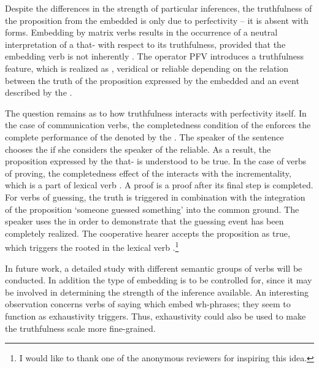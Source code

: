 \documentclass[output=paper,  modfonts,  newtxmath,  hidelinks		  ]{langscibook}
\begin{document}
Despite the differences in the strength of particular inferences, the truthfulness of the proposition from the embedded  is only due to perfectivity – it is absent with  forms. Embedding by  matrix verbs results in the occurrence of a neutral interpretation of a that- with respect to its truthfulness, provided that the embedding  verb is not inherently . The  operator PFV introduces a truthfulness feature, which is realized as , veridical or reliable depending on the relation between the truth of the proposition expressed by the embedded  and an event described by the .

The question remains as to how truthfulness interacts with perfectivity itself. In the case of communication verbs, the completedness condition of the  enforces the complete performance of the  denoted by the . The speaker of the sentence chooses the  if she considers the speaker of the  reliable. As a result, the proposition expressed by the that- is understood to be true. In the case of verbs of proving, the completedness effect of the  interacts with the incrementality, which is a part of lexical verb . A proof is a proof after its final step is completed. For verbs of guessing, the truth  is triggered in combination with the integration of the proposition `someone guessed something' into the common ground. The speaker uses the  in order to demonstrate that the guessing event has been completely realized. The cooperative hearer accepts the proposition as true, which triggers the  rooted in the lexical verb .\footnote{I would like to thank one of the anonymous reviewers for inspiring this idea.}

In future work, a detailed study with different semantic groups of verbs will be conducted. In addition the type of embedding is to be controlled for, since it may be involved in determining the strength of the inference available. An interesting observation concerns  verbs of saying which embed wh-phrases; they seem to function as exhaustivity triggers. Thus, exhaustivity could also be used to make the truthfulness scale more fine-grained.
 
\end{document}
